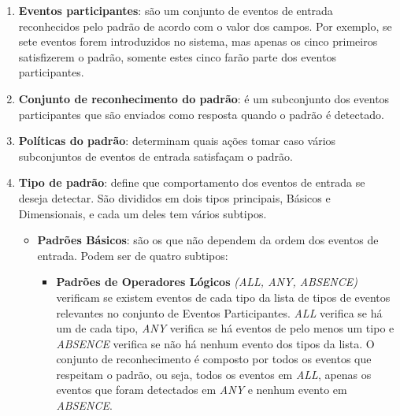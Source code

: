 \begin{itemize}
\begin{enumerate}
\item \textbf{Eventos participantes}: são um conjunto de eventos de entrada reconhecidos pelo padrão de acordo com o valor dos campos. Por exemplo, se sete eventos forem introduzidos no sistema, mas apenas os cinco primeiros satisfizerem o padrão, somente estes cinco farão parte dos eventos participantes. 
\item \textbf{Conjunto de reconhecimento do padrão}: é um subconjunto dos eventos participantes que são enviados como resposta quando o padrão é detectado. 
\item \textbf{Políticas do padrão}: determinam quais ações tomar caso vários subconjuntos de eventos de entrada satisfaçam o padrão. 
\item \textbf{Tipo de padrão}: define que comportamento dos eventos de entrada se deseja detectar. São divididos em dois tipos principais, Básicos e Dimensionais, e cada um deles tem vários subtipos. 
\begin{itemize}
\item \textbf{Padrões Básicos}: são os que não dependem da ordem dos eventos de entrada. Podem ser de quatro subtipos:
\begin{itemize}
\item \textbf{Padrões de Operadores Lógicos} \emph{(ALL, ANY, ABSENCE)} verificam se existem eventos de cada tipo da lista de tipos de eventos relevantes no conjunto de Eventos Participantes. \emph{ALL} verifica se há um de cada tipo, \emph{ANY} verifica se há eventos de pelo menos um tipo e \emph{ABSENCE} verifica se não há nenhum evento dos tipos da lista. O conjunto de reconhecimento é composto por todos os eventos que respeitam o padrão, ou seja, todos os eventos em \emph{ALL}, apenas os eventos que foram detectados em \emph{ANY} e nenhum evento em \emph{ABSENCE}.

\end{itemize}
\end{itemize}
\end{enumerate}
\end{itemize}
